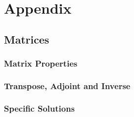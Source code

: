 \section{Appendix}
\subsection{Matrices}
\subsubsection{Matrix Properties}\label{app:mat_prop}



\subsubsection{Transpose, Adjoint and Inverse}



\subsubsection{Specific Solutions}



